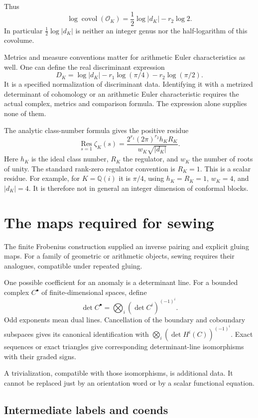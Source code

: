 Thus
\[
 \log\operatorname{covol}(\mathcal O_K)
    =\frac12\log|d_K|-r_2\log2.
\]
In particular $\tfrac12\log|d_K|$ is neither an integer genus nor the
half-logarithm of this covolume.

Metrics and measure conventions matter for arithmetic Euler characteristics
as well. One can define the real discriminant expression
\[
 D_K=\log|d_K|-r_1\log(\pi/4)-r_2\log(\pi/2).
\]
It is a specified normalization of discriminant data. Identifying it with a
metrized determinant of cohomology or an arithmetic Euler characteristic
requires the actual complex, metrics and comparison formula. The expression
alone supplies none of them.

The analytic class-number formula gives the positive residue
\[
 \operatorname*{Res}_{s=1}\zeta_K(s)
  =\frac{2^{r_1}(2\pi)^{r_2}h_KR_K}
          {w_K\sqrt{|d_K|}}.
\]
Here $h_K$ is the ideal class number, $R_K$ the regulator, and $w_K$ the
number of roots of unity. The standard rank-zero regulator convention is
$R_K=1$. This is a scalar residue. For example, for $K=\mathbb Q(i)$ it is
$\pi/4$, using $h_K=R_K=1$, $w_K=4$, and $|d_K|=4$. It is therefore not in
general an integer dimension of conformal blocks.

\section{The maps required for sewing}

The finite Frobenius construction supplied an inverse pairing and explicit
gluing maps. For a family of geometric or arithmetic objects, sewing
requires their analogues, compatible under repeated gluing.

One possible coefficient for an anomaly is a determinant line. For a bounded
complex $C^\bullet$ of finite-dimensional spaces, define
\[
 \det C^\bullet
   =\bigotimes_i(\det C^i)^{(-1)^i}.
\]
Odd exponents mean dual lines. Cancellation of the boundary and coboundary
subspaces gives its canonical identification with $\bigotimes_i(\det
H^i(C))^{(-1)^i}$. Exact sequences or exact triangles give corresponding
determinant-line isomorphisms with their graded signs.

A trivialization, compatible with those isomorphisms, is additional data. It
cannot be replaced just by an orientation word or by a scalar functional
equation.

\subsection{Intermediate labels and coends}

